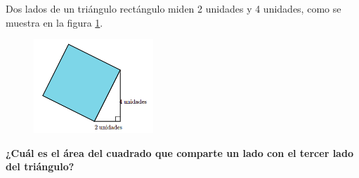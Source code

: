 \question[15]  Dos lados de un triángulo rectángulo miden 2 unidades y 4 unidades, como se muestra en la figura \ref{fig:area10}.
\begin{figure}[H]
    \begin{center}
        \includegraphics[width=0.4\textwidth]{../images/area10.png}
    \end{center}
    \caption{}
    \label{fig:area10}
\end{figure}
\textbf{¿Cuál es el área del cuadrado que comparte un lado con el tercer lado del triángulo?}